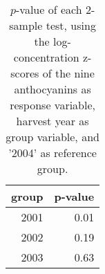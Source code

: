 \begin{table}[ht]
\centering
\begin{tabular}{rr}
  \hline
group & p-value \\ 
  \hline
2001 & 0.01 \\ 
  2002 & 0.19 \\ 
  2003 & 0.63 \\ 
   \hline
\end{tabular}
\caption{
            $p$-value of each 2-sample test, using the log-concentration 
            z-scores of the nine anthocyanins as response variable, 
            harvest year as group variable, and '2004' 
            as reference group.
        } 
\label{tbl:3}
\end{table}
